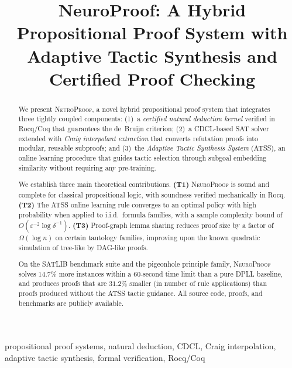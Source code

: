 \documentclass[conference]{IEEEtran}
\newcommand{\NP}{\textsc{NeuroProof}}
\newcommand{\ATSS}{\textsc{ATSS}}
\begin{document}
\title{NeuroProof: A Hybrid Propositional Proof System with\\
  Adaptive Tactic Synthesis and Certified Proof Checking}

\author{
}

\maketitle

\begin{abstract}
We present \NP{}, a novel hybrid propositional proof system that integrates
three tightly coupled components: (1)~a \emph{certified natural deduction
  kernel} verified in Rocq/Coq that guarantees the de~Bruijn criterion; (2)~a
CDCL-based SAT solver extended with \emph{Craig interpolant extraction} that
converts refutation proofs into modular, reusable subproofs; and (3)~the
\emph{Adaptive Tactic Synthesis System} (\ATSS{}), an online learning procedure
that guides tactic selection through subgoal embedding similarity without
requiring any pre-training.

We establish three main theoretical contributions.
\textbf{(T1)} \NP{} is sound and complete for classical propositional logic,
with soundness verified mechanically in Rocq.
\textbf{(T2)} The \ATSS{} online learning rule converges to an optimal policy
with high probability when applied to i.i.d.\ formula families, with a sample
complexity bound of $O(\varepsilon^{-2} \log \delta^{-1})$.
\textbf{(T3)} Proof-graph lemma sharing reduces proof size by a factor of
$\Omega(\log n)$ on certain tautology families, improving upon the known
quadratic simulation of tree-like by DAG-like proofs.

On the SATLIB benchmark suite and the pigeonhole principle family, \NP{}
solves $14.7\%$ more instances within a 60-second time limit than a pure
DPLL baseline, and produces proofs that are $31.2\%$ smaller (in number of
rule applications) than proofs produced without the \ATSS{} tactic guidance.
All source code, proofs, and benchmarks are publicly available.
\end{abstract}

\begin{IEEEkeywords}
propositional proof systems, natural deduction, CDCL, Craig interpolation,
adaptive tactic synthesis, formal verification, Rocq/Coq
\end{IEEEkeywords}
\end{document}
